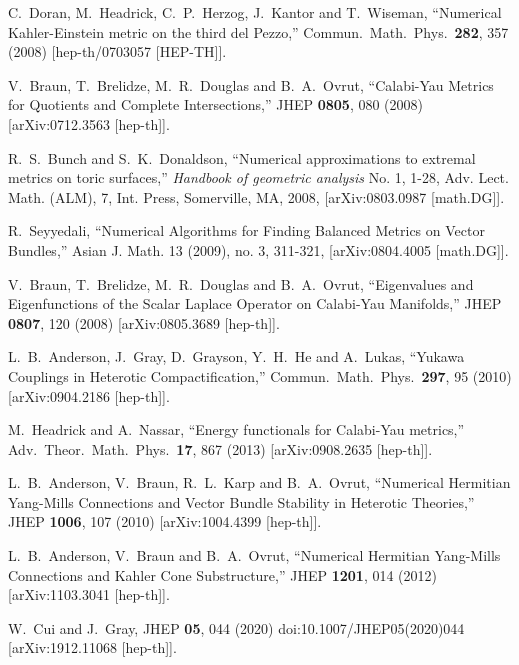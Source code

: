 \documentclass[12pt]{article}
\begin{document}
{{{{\begin{thebibliography}{10}
  C.~Doran, M.~Headrick, C.~P.~Herzog, J.~Kantor and T.~Wiseman,
  ``Numerical Kahler-Einstein metric on the third del Pezzo,''
  Commun.\ Math.\ Phys.\  {\bf 282}, 357 (2008)
  [hep-th/0703057 [HEP-TH]].

  V.~Braun, T.~Brelidze, M.~R.~Douglas and B.~A.~Ovrut,
  ``Calabi-Yau Metrics for Quotients and Complete Intersections,''
  JHEP {\bf 0805}, 080 (2008)
  [arXiv:0712.3563 [hep-th]].

 R.~S.~Bunch and S.~K.~Donaldson,
  ``Numerical approximations to extremal metrics on toric surfaces,''
  {\it Handbook of geometric analysis} No. 1, 1-28,
 Adv. Lect. Math. (ALM), 7, Int. Press, Somerville, MA, 2008, 
 [arXiv:0803.0987 [math.DG]].

 R.~Seyyedali,
   ``Numerical Algorithms for Finding Balanced Metrics on Vector Bundles,''
   Asian J. Math. 13 (2009), no. 3, 311-321, 
   [arXiv:0804.4005 [math.DG]].

  V.~Braun, T.~Brelidze, M.~R.~Douglas and B.~A.~Ovrut,
  ``Eigenvalues and Eigenfunctions of the Scalar Laplace Operator on Calabi-Yau Manifolds,''
  JHEP {\bf 0807}, 120 (2008)
  [arXiv:0805.3689 [hep-th]].
    
  L.~B.~Anderson, J.~Gray, D.~Grayson, Y.~H.~He and A.~Lukas,
  ``Yukawa Couplings in Heterotic Compactification,''
  Commun.\ Math.\ Phys.\  {\bf 297}, 95 (2010)
  [arXiv:0904.2186 [hep-th]].

  M.~Headrick and A.~Nassar,
  ``Energy functionals for Calabi-Yau metrics,''
  Adv.\ Theor.\ Math.\ Phys.\  {\bf 17}, 867 (2013)
  [arXiv:0908.2635 [hep-th]].

  L.~B.~Anderson, V.~Braun, R.~L.~Karp and B.~A.~Ovrut,
  ``Numerical Hermitian Yang-Mills Connections and Vector Bundle Stability in Heterotic Theories,''
  JHEP {\bf 1006}, 107 (2010)
  [arXiv:1004.4399 [hep-th]].

  L.~B.~Anderson, V.~Braun and B.~A.~Ovrut,
  ``Numerical Hermitian Yang-Mills Connections and Kahler Cone Substructure,''
  JHEP {\bf 1201}, 014 (2012)
  [arXiv:1103.3041 [hep-th]].
  
W.~Cui and J.~Gray,
JHEP \textbf{05}, 044 (2020)
doi:10.1007/JHEP05(2020)044
[arXiv:1912.11068 [hep-th]].


\end{thebibliography}}}}}
\end{document}
